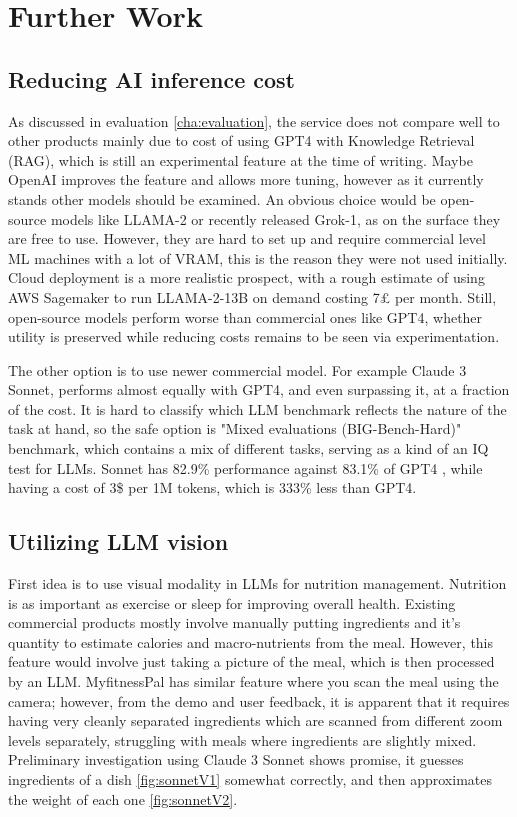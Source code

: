 \section{Further Work}
\subsection{Reducing AI inference cost}
\label{subsec:tryingOther}
As discussed in evaluation \ref{cha:evaluation}, the service does not compare well to other products mainly due to cost of using GPT4 with Knowledge Retrieval (RAG), which is still an experimental feature at the time of writing. Maybe OpenAI improves the feature and allows more tuning, however as it currently stands other models should be examined. An obvious choice would be open-source models like LLAMA-2 or recently released Grok-1, as on the surface they are free to use. However, they are hard to set up and require commercial level ML machines with a lot of VRAM, this is the reason they were not used initially. Cloud deployment is a more realistic prospect, with a rough estimate of using AWS Sagemaker to run LLAMA-2-13B on demand costing 7£ per month. Still, open-source models perform worse than commercial ones like GPT4, whether utility is preserved while reducing costs remains to be seen via experimentation.

The other option is to use newer commercial model. For example Claude 3 Sonnet, performs almost equally with GPT4, and even surpassing it, at a fraction of the cost. It is hard to classify which LLM benchmark reflects the nature of the task at hand, so the safe option is "Mixed evaluations (BIG-Bench-Hard)" benchmark, which contains a mix of different tasks, serving as a kind of an IQ test for LLMs. Sonnet has 82.9\% performance against 83.1\% of GPT4 \cite{claude3Bench}, while having a cost of 3\$ per 1M tokens, which is 333\% less than GPT4.

\subsection{Utilizing LLM vision}
First idea is to use visual modality in LLMs for nutrition management. Nutrition is as important as exercise or sleep for improving overall health. Existing commercial products mostly involve manually putting ingredients and it's quantity to estimate calories and macro-nutrients from the meal. However, this feature would involve just taking a picture of the meal, which is then processed by an LLM. MyfitnessPal has similar feature where you scan the meal using the camera; however, from the demo and user feedback, it is apparent that it requires having very cleanly separated ingredients which are scanned from different zoom levels separately, struggling with meals where ingredients are slightly mixed. Preliminary investigation using Claude 3 Sonnet shows promise, it guesses ingredients of a dish \ref{fig:sonnetV1} somewhat correctly, and then approximates the weight of each one \ref{fig:sonnetV2}.


